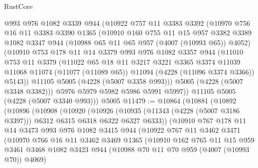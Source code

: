 \begin{lexlean}{RustCore}
\begin{coremodule}
      @993
      @976
      @1082
      @3339
      @944
      (@10922
        @757
        @11
        @3383
        @3392
        (@10970
          @756
          @16
          @11
          @3383
          @3390
          @1365
          (@10910
            @160
            @755
            @11
            @15
            @957
            @3382
            @3389
            @1082
            @3347
            @944
            (@10988 @65 @11 @65 @957 (@4007 (@10993 @65)) @4052)
            (@10910
              @753
              @178
              @11
              @14
              @3379
              @993
              @976
              @1082
              @3357
              @944
              (@11010
                @753
                @11
                @3379
                (@11022
                  @65
                  @18
                  @11
                  @3217
                  @3221
                  @3365
                  @3374
                  @11039
                  @11068
                  @11074
                  (@11077 (@11089 @65))
                  @11094
                  (@4228 (@11096 @3374 @3366))
                  @5143))
              @11105
              @5005
              (@4228 (@5007 @3358 @993)))
            @5005
            (@4228 (@5007 @3348 @3382)))
          @5976
          @5979
          @5982
          @5986
          @5991
          @5997))
      @11105
      @5005
      (@4228 (@5007 @3340 @993)))
    @5005
@11479 := @10864
    (@10881
      (@10892
        (@10896
          (@10908
            (@10920
              (@10926
                (@10935 (@11343 (@4228 (@5007 @3186 @3397))) @6312 @6315 @6318 @6322 @6327 @6333))
              (@10910
                @767
                @178
                @11
                @14
                @3473
                @993
                @976
                @1082
                @3415
                @944
                (@10922
                  @767
                  @11
                  @3462
                  @3471
                  (@10970
                    @766
                    @16
                    @11
                    @3462
                    @3469
                    @1365
                    (@10910
                      @162
                      @765
                      @11
                      @15
                      @959
                      @3461
                      @3468
                      @1082
                      @3423
                      @944
                      (@10988 @70 @11 @70 @959 (@4007 (@10993 @70)) @4069)

\end{coremodule}
\end{lexlean}
